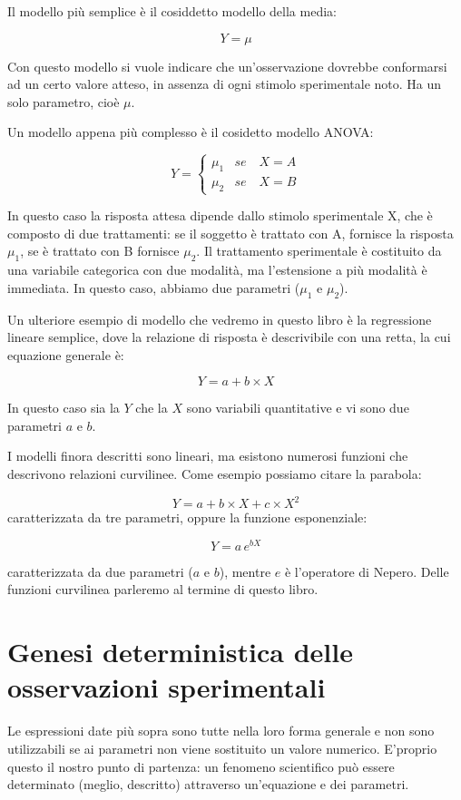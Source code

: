 \documentclass[a4paper,12pt,oneside]{book}
\theoremstyle{definition}
\theoremstyle{definition}
\theoremstyle{definition}
\theoremstyle{remark}
\begin{document}
Il modello più semplice è il cosiddetto modello della media:

\[ Y = \mu \]

Con questo modello si vuole indicare che un'osservazione dovrebbe
conformarsi ad un certo valore atteso, in assenza di ogni stimolo
sperimentale noto. Ha un solo parametro, cioè \(\mu\).

Un modello appena più complesso è il cosidetto modello ANOVA:

\[
Y = \left\{ {\begin{array}{ll}
\mu_1 & se \quad X = A \\
\mu_2 & se \quad X = B
\end{array}} \right.
\]

In questo caso la risposta attesa dipende dallo stimolo sperimentale X,
che è composto di due trattamenti: se il soggetto è trattato con A,
fornisce la risposta \(\mu_1\), se è trattato con B fornisce \(\mu_2\).
Il trattamento sperimentale è costituito da una variabile categorica con
due modalità, ma l'estensione a più modalità è immediata. In questo
caso, abbiamo due parametri (\(\mu_1\) e \(\mu_2\)).

Un ulteriore esempio di modello che vedremo in questo libro è la
regressione lineare semplice, dove la relazione di risposta è
descrivibile con una retta, la cui equazione generale è:

\[ Y = a + b \times X \]

In questo caso sia la \(Y\) che la \(X\) sono variabili quantitative e
vi sono due parametri \(a\) e \(b\).

I modelli finora descritti sono lineari, ma esistono numerosi funzioni
che descrivono relazioni curvilinee. Come esempio possiamo citare la
parabola:

\[ Y = a + b \times X + c \times X^2\] caratterizzata da tre parametri,
oppure la funzione esponenziale:

\[ Y = a \, e^{b X} \]

caratterizzata da due parametri (\(a\) e \(b\)), mentre \(e\) è
l'operatore di Nepero. Delle funzioni curvilinea parleremo al termine di
questo libro.

\section{Genesi deterministica delle osservazioni
sperimentali}\label{genesi-deterministica-delle-osservazioni-sperimentali}

Le espressioni date più sopra sono tutte nella loro forma generale e non
sono utilizzabili se ai parametri non viene sostituito un valore
numerico. E'proprio questo il nostro punto di partenza: un fenomeno
scientifico può essere determinato (meglio, descritto) attraverso
un'equazione e dei parametri.
\end{document}

